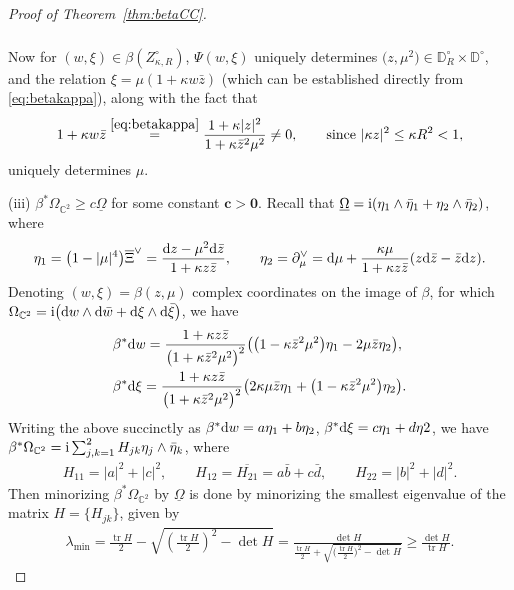 \documentclass[pdftex]{sigma}
\numberwithin{equation}{section}
\theoremstyle{definition}
\newcommand{\1}{{\bf 1}}
\newcommand \Cm { \mathbb{C}}
\newcommand \Dm { \mathbb{D}}
\newcommand \zbar { \bar{z}}
\begin{document}
\begin{proof}[Proof of Theorem~\ref{thm:betaCC}]
\begin{align*}
\begin{split}
		\end{split}
	\end{align*}
	Now for $(w,\xi)\in \beta(Z_{\kappa,R}^\circ)$, $\Psi(w,\xi)$ uniquely determines $\bigl(z,\mu^2\bigr)\in \Dm_R^\circ\times \Dm^\circ$, and the relation $\xi = \mu (1+\kappa w\zbar)$ (which can be established directly from \eqref{eq:betakappa}), along with the fact that
	\begin{align*}
		1 + \kappa w \zbar \stackrel{\eqref{eq:betakappa}}{=} \frac{1+\kappa |z|^2}{1+\kappa \zbar^2 \mu^2} \ne 0, \qquad \text{since} \  |\kappa z|^2\le\kappa R^2<1,
	\end{align*}
	 uniquely determines $\mu$.


(iii) $\beta^* \Omega_{\Cm^2} \ge c \underline{\Omega}$ for some constant $\boldsymbol{c>0}$. Recall that $\underline{\Omega} ={\rm i} (\eta_1\wedge \bar{\eta}_1 + \eta_2 \wedge \bar{\eta}_2)$, where
	\begin{align*}
		\eta_1 = \bigl(1-|\mu|^4\bigr) \overline{\Xi}^\vee = \frac{{\rm d}z-\mu^2 {\rm d}\zbar}{1+\kappa z\zbar}, \qquad \eta_2 = \partial_\mu^\vee = {\rm d}\mu + \frac{\kappa\mu}{1+\kappa z\zbar} (z{\rm d}\zbar-\zbar {\rm d}z).
	\end{align*}
	Denoting $(w,\xi) = \beta(z,\mu)$ complex coordinates on the image of $\beta$, for which $\Omega_{\Cm^2} = {\rm i} \bigl({\rm d}w\wedge {\rm d}\bar{w} + {\rm d}\xi \wedge {\rm d}\bar{\xi}\bigr)$, we have
	\begin{align*}
		&\beta^* {\rm d}w
= \frac{1+\kappa z\zbar}{\bigl(1+\kappa\zbar^2 \mu^2\bigr)^2} \bigl( \bigl(1-\kappa \zbar^2\mu^2\bigr) \eta_1 - 2\mu\zbar \eta_2 \bigr), \\
		&\beta^* {\rm d}\xi
= \frac{1+\kappa z\zbar}{\bigl(1+\kappa\zbar^2 \mu^2\bigr)^2} \bigl( 2\kappa\mu\zbar \eta_1 + \bigl(1-\kappa\zbar^2\mu^2\bigr) \eta_2 \bigr).
	\end{align*}
	Writing the above succinctly as
$\beta^* {\rm d}w = a\eta_1 + b\eta_2$, $ \beta^* {\rm d}\xi = c\eta_1 + d\eta2$,
	we have $\beta^* \Omega_{\Cm^2} = {\rm i}\sum_{j,k=1}^2 H_{jk} \eta_j \wedge \bar{\eta}_k$, where
	\begin{align*}
		H_{11} = |a|^2 + |c|^2, \qquad H_{12} = \overline{H_{21}} = a \bar{b} + c \bar{d}, \qquad H_{22} = |b|^2 + |d|^2.
	\end{align*}
	Then minorizing $\beta^* \Omega_{\Cm^2}$ by $\underline{\Omega}$ is done by minorizing the smallest eigenvalue of the matrix $H = \{H_{jk}\}$, given by
	\begin{align*}
		\lambda_{\min} = \frac{\operatorname{tr} H}{2} - \sqrt{ \left(\frac{\operatorname{tr} H}{2}\right)^2 - \det H} = \frac{\det H}{\frac{\operatorname{tr} H}{2} + \sqrt{ \bigl(\frac{\operatorname{tr} H}{2}\bigr)^2 - \det H}} \ge \frac{\det H}{\operatorname{tr} H}.

\end{align*}
\end{proof}
\end{document}

